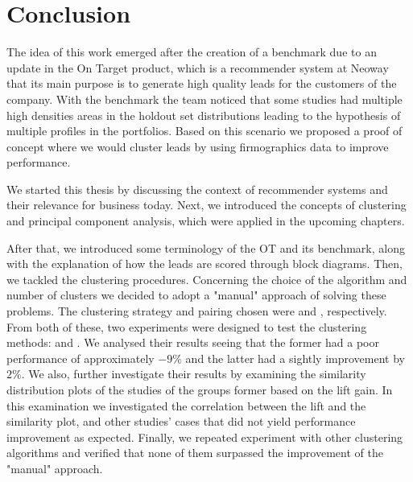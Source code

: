 \chapter{Conclusion} 
\label{cha:conclusion}

The idea of this work emerged after the creation of a benchmark due to an update in the On Target product, which is a recommender system at Neoway that its main purpose is to generate high quality leads for the customers of the company. With the benchmark the team noticed that some studies had multiple high densities areas in the holdout set distributions leading to the hypothesis of multiple profiles in the portfolios. Based on this scenario we proposed a proof of concept where we would cluster leads by using firmographics data to improve performance.

We started this thesis by discussing the context of recommender systems and their relevance for business today. Next, we introduced the concepts of clustering and principal component analysis, which were applied in the upcoming chapters.

After that, we introduced some terminology of the OT and its benchmark, along with the explanation of how the leads are scored through block diagrams. Then, we tackled the clustering procedures. Concerning the choice of the algorithm and number of clusters we decided to adopt a "manual" approach of solving these problems. The clustering strategy and pairing chosen were \nameClusterStrategyA{} and \nameClusterPairingA{}, respectively. From both of these, two experiments were designed to test the clustering methods: \nameExperimentI{} and \nameExperimentII{}.
We analysed their results seeing that the former had a poor performance of approximately $-9\%$ and the latter had a sightly improvement by $2\%$. We also, further investigate their results by examining the similarity distribution plots of the studies of the groups former based on the lift gain. In this examination we investigated the correlation between the lift and the similarity plot, and other studies' cases that did not yield performance improvement as expected. Finally, we repeated experiment \nameExperimentII{} with other clustering algorithms and verified that none of them surpassed the improvement of the "manual" approach.

